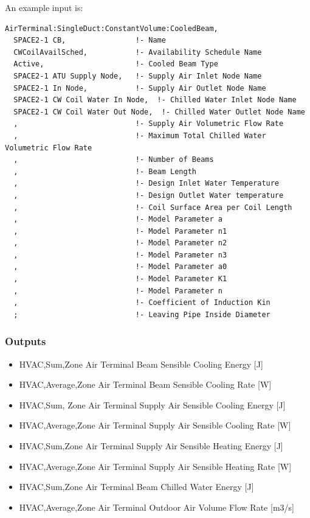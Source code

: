 An example input is:

\begin{lstlisting}
AirTerminal:SingleDuct:ConstantVolume:CooledBeam,
  SPACE2-1 CB,                !- Name
  CWCoilAvailSched,           !- Availability Schedule Name
  Active,                     !- Cooled Beam Type
  SPACE2-1 ATU Supply Node,   !- Supply Air Inlet Node Name
  SPACE2-1 In Node,           !- Supply Air Outlet Node Name
  SPACE2-1 CW Coil Water In Node,  !- Chilled Water Inlet Node Name
  SPACE2-1 CW Coil Water Out Node,  !- Chilled Water Outlet Node Name
  ,                           !- Supply Air Volumetric Flow Rate
  ,                           !- Maximum Total Chilled Water Volumetric Flow Rate
  ,                           !- Number of Beams
  ,                           !- Beam Length
  ,                           !- Design Inlet Water Temperature
  ,                           !- Design Outlet Water temperature
  ,                           !- Coil Surface Area per Coil Length
  ,                           !- Model Parameter a
  ,                           !- Model Parameter n1
  ,                           !- Model Parameter n2
  ,                           !- Model Parameter n3
  ,                           !- Model Parameter a0
  ,                           !- Model Parameter K1
  ,                           !- Model Parameter n
  ,                           !- Coefficient of Induction Kin
  ;                           !- Leaving Pipe Inside Diameter
\end{lstlisting}

\subsubsection{Outputs}\label{outputs-11}

\begin{itemize}
\item
  HVAC,Sum,Zone Air Terminal Beam Sensible Cooling Energy {[}J{]}
\item
  HVAC,Average,Zone Air Terminal Beam Sensible Cooling Rate {[}W{]}
\item
  HVAC,Sum, Zone Air Terminal Supply Air Sensible Cooling Energy {[}J{]}
\item
  HVAC,Average,Zone Air Terminal Supply Air Sensible Cooling Rate {[}W{]}
\item
  HVAC,Sum,Zone Air Terminal Supply Air Sensible Heating Energy {[}J{]}
\item
  HVAC,Average,Zone Air Terminal Supply Air Sensible Heating Rate {[}W{]}
\item
  HVAC,Sum,Zone Air Terminal Beam Chilled Water Energy {[}J{]}
\item
  HVAC,Average,Zone Air Terminal Outdoor Air Volume Flow Rate {[}m3/s{]}
\end{itemize}

